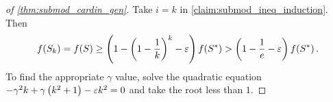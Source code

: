\begin{proof}[of \cref{thm:submod_cardin_gen}]
    Take $i = k$ in \cref{claim:submod_ineq_induction}. Then 
    \begin{equation*}
        f \! \left( S_k \right) = f \! \left( S \right) \geq \left( 1 - \left( 1 - \frac{1}{k} \right)^k - \varepsilon \right)f \! \left( S^{\ast} \right) > \left( 1 - \frac{1}{e} - \varepsilon \right)f \! \left( S^{\ast} \right). 
    \end{equation*}
    To find the appropriate $\gamma$ value, solve the quadratic equation $-\gamma^2k + \gamma \left( k^2+1 \right) - \varepsilon k^2 = 0$ and take the root less than $1$.  
\end{proof}
